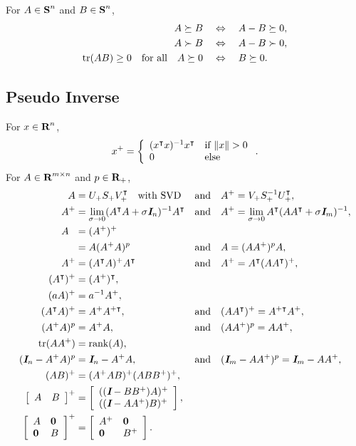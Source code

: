 \documentclass{article}
\begin{document}
    For $A\in\textbf{S}^n$ and $B\in\textbf{S}^n$,
    \begin{align*}
        A\succeq B\quad&\Leftrightarrow\quad A-B\succeq 0,\\
        A\succ B\quad&\Leftrightarrow\quad A-B\succ 0,\\
        \text{tr}(AB)\geq 0 \quad \text{for all} \quad A\succeq0 \quad &\Leftrightarrow \quad B\succeq 0.
    \end{align*}

\clearpage
\subsection{Pseudo Inverse}

    For $x\in\textbf{R}^n$,
    \begin{align*}
        x^+ =   \left\{\arr{ 
                    (x^\tp x)^{-1} x^\tp& \text{if $\|x\|>0$} 
                    \\
                    0 &\text{else} 
                    }\right..
    \end{align*}
    For $A\in\textbf{R}^{m\times n}$ and $p\in\textbf{R}_+$,
    \begin{align*}
        A&=U_+S_+V_+^\intercal\quad\text{with SVD}&&\text{and}\quad A^+=V_+S_+^{-1}U_+^\intercal,\\
        A^+&=\lim_{\sigma\to0}(A^\intercal A+\sigma\emph{\textbf{I}}_n)^{-1} A^\intercal&&\text{and}\quad A^+=\lim_{\sigma\to0}A^\intercal(AA^\intercal+\sigma\emph{\textbf{I}}_m)^{-1},\\
        A^{\phantom{+}}&=(A^+)^+\\
        &=A(A^+A)^p&&\text{and}\quad A=(AA^+)^pA,\\
        A^+&=(A^\intercal A)^+ A^\intercal&&\text{and}\quad A^+=A^\intercal(AA^\intercal)^+,\\
        (A^\intercal)^+&=(A^+)^\intercal,\\
        (aA)^+&=a^{-1}A^+,\\        
        (A^\intercal A)^+&=A^+A^{+\intercal},&&\text{and}\quad (AA^\intercal)^+=A^{+\intercal}A^+,\\
        (A^+A)^p&=A^+A,&&\text{and}\quad (AA^+)^p=AA^+,\\
        \text{tr}(AA^+)&=\text{rank}(A),\\
        (\emph{\textbf{I}}_n-A^+A)^p&=\emph{\textbf{I}}_n-A^+A,&&\text{and}\quad (\emph{\textbf{I}}_m-AA^+)^p=\emph{\textbf{I}}_m-AA^+,\\
        (AB)^+&=(A^+AB)^+(ABB^+)^+,\\
        \left[\begin{array}{lllllllllllllllllll}A&B\end{array}\right]^+&=\left[\begin{array}{lllllllllllllllllll}((\emph{\textbf{I}}-BB^+)A)^+ \\ ((\emph{\textbf{I}}-AA^+)B)^+\end{array}\right],\\
        \left[\begin{array}{lllllllllllllllllll}A & \textbf{0} \\ \textbf{0} & B \end{array}\right]^+&=\left[\begin{array}{lllllllllllllllllll}A^+ & \textbf{0} \\ \textbf{0} & B^+ \end{array}\right].
    \end{align*}
\end{document}
